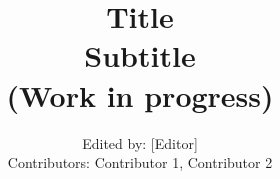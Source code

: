  \title{ \textbf{Title}\\ Subtitle\\
 (Work in progress)}
  \author{Edited by: [Editor]\\[1ex]
 Contributors:
 Contributor 1, Contributor 2 \\
  }

